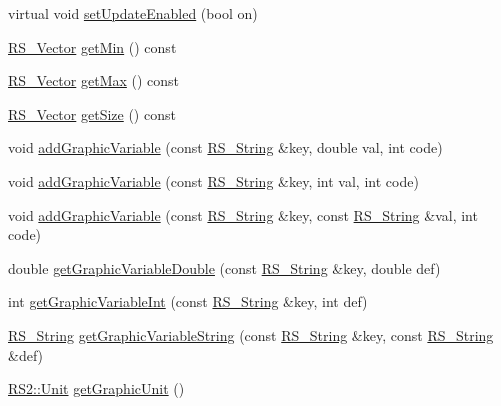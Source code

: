 \begin{DoxyCompactItemize}
virtual void \hyperlink{class_r_s___entity_a4415833bd1f3f5d21c7ced13c0940282}{set\-Update\-Enabled} (bool on)
\item 
\hyperlink{class_r_s___vector}{R\-S\-\_\-\-Vector} \hyperlink{class_r_s___entity_a952d0489c02974c4b46b7a82ef45d91e}{get\-Min} () const 
\item 
\hyperlink{class_r_s___vector}{R\-S\-\_\-\-Vector} \hyperlink{class_r_s___entity_ae29b7631a2b7d5c9d2294078058dc8a0}{get\-Max} () const 
\item 
\hyperlink{class_r_s___vector}{R\-S\-\_\-\-Vector} \hyperlink{class_r_s___entity_a6273fe38e8b5abee421413b88d33f984}{get\-Size} () const 
\item 
void \hyperlink{class_r_s___entity_a56f7e6822c6a7b2c55047fcda4bcbf06}{add\-Graphic\-Variable} (const \hyperlink{rs__string_8h_a5adec11f318c2ae2ecdc6fe2b03be9fa}{R\-S\-\_\-\-String} \&key, double val, int code)
\item 
void \hyperlink{class_r_s___entity_a6df4c5deae3c754f64c8b8354340854a}{add\-Graphic\-Variable} (const \hyperlink{rs__string_8h_a5adec11f318c2ae2ecdc6fe2b03be9fa}{R\-S\-\_\-\-String} \&key, int val, int code)
\item 
void \hyperlink{class_r_s___entity_ad8e2eac0ce6f9c2d4e35f26e93d6cdb4}{add\-Graphic\-Variable} (const \hyperlink{rs__string_8h_a5adec11f318c2ae2ecdc6fe2b03be9fa}{R\-S\-\_\-\-String} \&key, const \hyperlink{rs__string_8h_a5adec11f318c2ae2ecdc6fe2b03be9fa}{R\-S\-\_\-\-String} \&val, int code)
\item 
double \hyperlink{class_r_s___entity_acad2660943c038b6ddbe3ccabb77d13a}{get\-Graphic\-Variable\-Double} (const \hyperlink{rs__string_8h_a5adec11f318c2ae2ecdc6fe2b03be9fa}{R\-S\-\_\-\-String} \&key, double def)
\item 
int \hyperlink{class_r_s___entity_a078d9bd8f58f3b9cc359def7d2e4e184}{get\-Graphic\-Variable\-Int} (const \hyperlink{rs__string_8h_a5adec11f318c2ae2ecdc6fe2b03be9fa}{R\-S\-\_\-\-String} \&key, int def)
\item 
\hyperlink{rs__string_8h_a5adec11f318c2ae2ecdc6fe2b03be9fa}{R\-S\-\_\-\-String} \hyperlink{class_r_s___entity_a3c70b5d59ad7cd6a2f17e5f86e39cd30}{get\-Graphic\-Variable\-String} (const \hyperlink{rs__string_8h_a5adec11f318c2ae2ecdc6fe2b03be9fa}{R\-S\-\_\-\-String} \&key, const \hyperlink{rs__string_8h_a5adec11f318c2ae2ecdc6fe2b03be9fa}{R\-S\-\_\-\-String} \&def)
\item 
\hyperlink{class_r_s2_ad859751df6978737e4f35ec111ff9828}{R\-S2\-::\-Unit} \hyperlink{class_r_s___entity_a310cdd4d48df4cf8114388cea80f47d9}{get\-Graphic\-Unit} ()

\end{DoxyCompactItemize}
